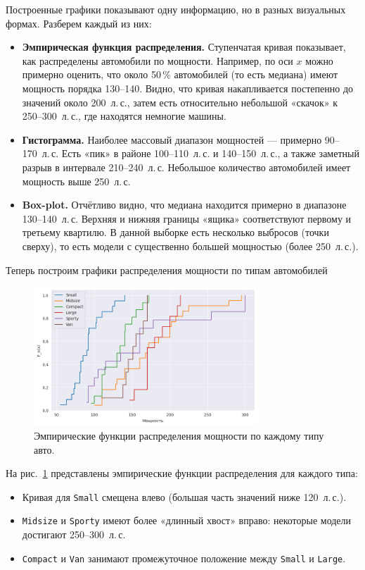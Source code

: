\documentclass[a4paper,12pt]{article}
\begin{document}
Построенные графики показывают одну информацию, но в разных визуальных формах. Разберем каждый из них:
\begin{itemize}
    \item \textbf{Эмпирическая функция распределения.} Ступенчатая кривая показывает, как распределены автомобили по мощности. Например, по оси $x$ можно примерно оценить, что около 50\,\% автомобилей (то есть медиана) имеют мощность порядка 130--140. Видно, что кривая накапливается постепенно до значений около 200~л.\,с., затем есть относительно небольшой «скачок» к 250--300~л.\,с., где находятся немногие машины.
    \item \textbf{Гистограмма.} Наиболее массовый диапазон мощностей --- примерно 90--170~л.\,с. Есть «пик» в районе 100--110~л.\,с. и 140--150~л.\,с., а также заметный разрыв в интервале 210--240~л.\,с. Небольшое количество автомобилей имеет мощность выше 250~л.\,с.
    \item \textbf{Box-plot.} Отчётливо видно, что медиана находится примерно в диапазоне 130--140~л.\,с. Верхняя и нижняя границы «ящика» соответствуют первому и третьему квартилю. В данной выборке есть несколько выбросов (точки сверху), то есть модели с существенно большей мощностью (более 250~л.\,с.).
\end{itemize}
Теперь построим графики распределения мощности по типам автомобилей
\begin{figure}[H]
    \centering
    \includegraphics[width=0.75\textwidth]{images/ecdf_types.png}
    \caption{Эмпирические функции распределения мощности по каждому типу авто.}
    \label{fig:ecdf_types}
\end{figure}

\noindent
На рис.~\ref{fig:ecdf_types} представлены эмпирические функции распределения         для каждого типа:
\begin{itemize}
    \item Кривая для \texttt{Small} смещена влево (большая часть значений ниже 120~л.\,с.).
    \item \texttt{Midsize} и \texttt{Sporty} имеют более «длинный хвост» вправо: некоторые модели достигают 250--300~л.\,с.
    \item \texttt{Compact} и \texttt{Van} занимают промежуточное положение между \texttt{Small} и \texttt{Large}.
\end{itemize}
\end{document}
